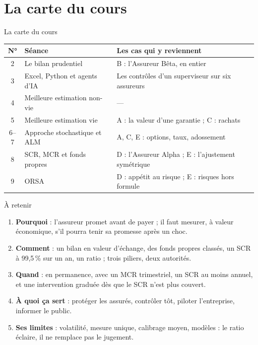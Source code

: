 \documentclass[10pt,aspectratio=169]{beamer}
\begin{document}
\section{La carte du cours}

\begin{frame}{La carte du cours}
\begin{table}
\centering
\small
\renewcommand{\arraystretch}{1.25}
\begin{tabular}{clp{6.4cm}}
\toprule
\textbf{N°} & \textbf{Séance} & \textbf{Les cas qui y reviennent} \\
\midrule
2 & Le bilan prudentiel & B : l'Assureur Bêta, en entier \\
3 & Excel, Python et agents d'IA & Les contrôles d'un superviseur sur six assureurs \\
4 & Meilleure estimation non-vie & --- \\
5 & Meilleure estimation vie & A : la valeur d'une garantie ; C : rachats \\
6--7 & Approche stochastique et ALM & A, C, E : options, taux, adossement \\
8 & SCR, MCR et fonds propres & D : l'Assureur Alpha ; E : l'ajustement symétrique \\
9 & ORSA & D : appétit au risque ; E : risques hors formule \\
\bottomrule
\end{tabular}
\end{table}
\end{frame}

\begin{frame}{À retenir}
\begin{enumerate}
  \item \textbf{Pourquoi} : l'assureur promet avant de payer ; il faut mesurer, à valeur
        économique, s'il pourra tenir sa promesse après un choc.
  \item \textbf{Comment} : un bilan en valeur d'échange, des fonds propres classés, un SCR à
        99,5\,\% sur un an, un ratio ; trois piliers, deux autorités.
  \item \textbf{Quand} : en permanence, avec un MCR trimestriel, un SCR au moins annuel, et une
        intervention graduée dès que le SCR n'est plus couvert.
  \item \textbf{À quoi ça sert} : protéger les assurés, contrôler tôt, piloter l'entreprise,
        informer le public.
  \item \textbf{Ses limites} : volatilité, mesure unique, calibrage moyen, modèles : le ratio
        éclaire, il ne remplace pas le jugement.
\end{enumerate}
\end{frame}
\end{document}
